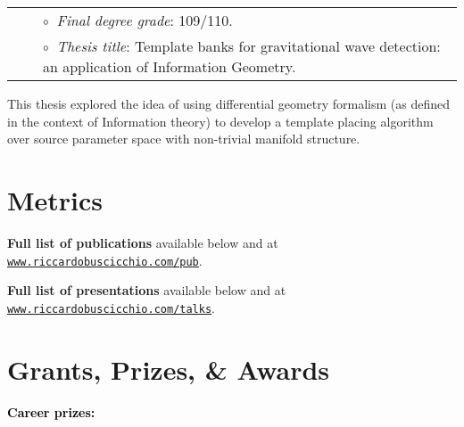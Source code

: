 \vspace{0.2cm}
\vspace{-0.1cm}
\begin{tabular}{rcl}
&\hspace{0.4cm} &$\circ\;\;${\textit{Final degree grade}}: 109/110.\\
&\hspace{0.4cm} &$\circ\;\;${\textit{Thesis title}}: Template banks for gravitational wave detection: an application of Information Geometry.
\end{tabular}
\vspace{0.2cm}

This thesis explored the idea of using differential geometry formalism (as defined in the context of Information theory) to develop a template placing algorithm over source parameter space with non-trivial manifold structure.


\newpage{}


\section{Metrics}



\textbf{Full list of publications} available 
below and
at \href{http://www.riccardobuscicchio.com/pub}{\texttt{www.riccardobuscicchio.com/pub}}.

%

\textbf{Full list of presentations} available
below and
at \href{http://www.riccardobuscicchio.com/talks}{\texttt{www.riccardobuscicchio.com/talks}}.

\section{Grants, Prizes, \& Awards}

\textbf{\textcolor{black}{Career prizes:}}
\vspace{0.1cm}

\vspace{-0.1cm}
\vspace{-0.1cm}

